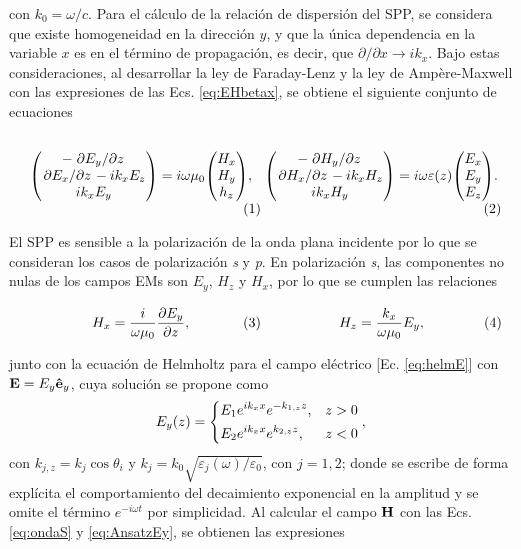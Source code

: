 \noindent con $k_0 = \omega/c$. Para el cálculo de la relación de dispersión del SPP, se considera que existe homogeneidad en la dirección $y$, y que la única dependencia en la variable $x$  es en el término de propagación, es decir, que $\partial/\partial x\to ik_x$. Bajo estas consideraciones, al desarrollar la ley de Faraday-Lenz y la ley de Ampère-Maxwell con las expresiones de las Ecs. \eqref{eq:EHbetax}, se obtiene el siguiente conjunto de ecuaciones \vspace*{-1em}

	\begin{subequations}
	\eqhalf{	\mqty(-\pdv*{E_y}{z} \\ \pdv*{E_x}{z}-ik_x E_z\\ik_x E_y)
				= i\omega\mu_0 \mqty(H_x\\H_y\\h_z),}
	\eqhalf{	\mqty(-\pdv*{H_y}{z} \\ \pdv*{H_x}{z}-ik_x H_z\\ik_x H_y)
				= i\omega\varepsilon(z) \mqty(E_x\\E_y\\E_z).}	
	\end{subequations}\noindent 

El SPP es sensible a la polarización de la onda plana incidente por lo que se consideran los casos de polarización \emph{s} y \emph{p}. En polarización \emph{s}, las componentes no nulas de los campos EMs son $E_y$, $H_z$ y $H_x$, por lo que se  cumplen las relaciones

	\begin{subequations}
	\eqhalf{	H_x =  \frac{i}{\omega \mu_0} \pdv{E_y}{z},\label{eq:Hx}}
	\eqhalf{H_z =  \frac{k_x}{\omega \mu_0} E_y, \label{eq:Hz}}	
	\label{eq:ondaS}	\end{subequations} \vspace*{-1em}

\noindent junto con la ecuación de Helmholtz para el campo eléctrico [Ec. \eqref{eq:helmE}] con  $\vb{E} = E_y\vu{e}_y$, cuya solución se propone como
%
	\begin{align}
	E_y(z) = \begin{dcases}
		E_1 e^{ik_x x} e^{-k_{1,z}z}, & z>0\\
		E_2 e^{ik_x x} e^{k_{2,z} z}, & z<0
		\end{dcases},\label{eq:AnsatzEy}
	\end{align}
%	
con $k_{j,z} = k_j\cos\theta_i$ y $k_j = k_0 \sqrt{\varepsilon_j(\omega)/\varepsilon_0}$, con $j = 1,2$; donde se escribe de forma explícita el comportamiento del decaimiento exponencial en la amplitud y se omite el término $e^{-i\omega t}$ por simplicidad. Al calcular el campo $\vb{H}$ con las Ecs. \eqref{eq:ondaS} y \eqref{eq:AnsatzEy}, se obtienen las expresiones 
	
